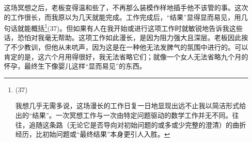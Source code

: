 这场冥想之后，老板变得温和些了，不再那么装模作样地插手他不该管的事。这次的工作很长，而我原以为几天就能完成。工作完成后，``结果''显得显而易见，用几句话就能概括\footnote{(37) \par 我想几乎无需多说，这场漫长的工作日复一日地显现出远不止我以简洁形式给出的``结果''。一次冥想工作与一次由特定问题驱动的数学工作并无不同。往往，追随这条路（无论它是否导向对初始问题的或多或少完整的澄清）的曲折经历，比初始问题或``最终结果''本身更引人入胜。}(37)。但如果有人在我开始或进行这项工作时就敏锐地告诉我这些话，恐怕对我毫无帮助。这项工作如此漫长，是因为阻力强大且深层。老板因此挨了不少教训，但他从未吭声，因为这是在一种他无法发脾气的氛围中进行的。可以肯定的是，这六个月用得很好，我无法省略它们；就像一个女人无法省略九个月的怀孕，最终生下像婴儿这样``显而易见''的东西。

